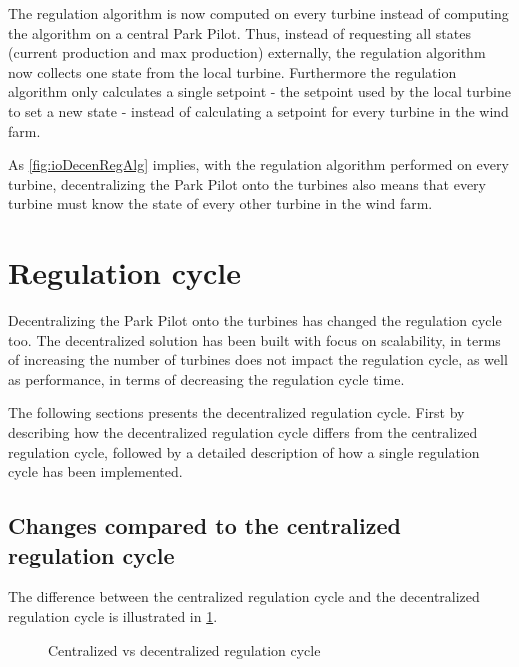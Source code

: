 The regulation algorithm is now computed on every turbine instead of computing the algorithm on a central Park Pilot. Thus, instead of requesting all states (current production and max production) externally, the regulation algorithm now collects one state from the local turbine. Furthermore the regulation algorithm only calculates a single setpoint - the setpoint used by the local turbine to set a new state - instead of calculating a setpoint for every turbine in the wind farm.

As \cref{fig:ioDecenRegAlg} implies, with the regulation algorithm performed on every turbine, decentralizing the Park Pilot onto the turbines also means that every turbine must know the state of every other turbine in the wind farm.

\section{Regulation cycle}

Decentralizing the Park Pilot onto the turbines has changed the regulation cycle too. The decentralized solution has been built with focus on scalability, in terms of increasing the number of turbines does not impact the regulation cycle, as well as performance, in terms of decreasing the regulation cycle time.

The following sections presents the decentralized regulation cycle. First by describing how the decentralized regulation cycle differs from the centralized regulation cycle, followed by a detailed description of how a single regulation cycle has been implemented. 


\subsection{Changes compared to the centralized regulation cycle}\label{sec:regCycleChanges}

The difference between the centralized regulation cycle and the decentralized regulation cycle is illustrated in \cref{fig:cycleCentralVSDecentral}. 

\begin{figure}[!h]

	{}
	\newline
	
	\newline
	
	{}
	\newline
	
	\caption{Centralized vs decentralized regulation cycle}
	\label{fig:cycleCentralVSDecentral}
\end{figure}

